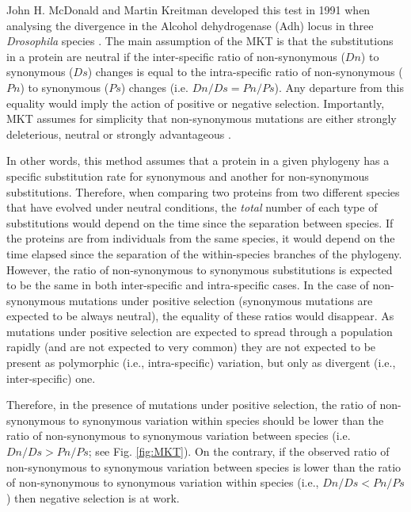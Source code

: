John H. McDonald and Martin Kreitman developed this test in 1991 when analysing the divergence in the Alcohol dehydrogenase (Adh) locus in three \textit{Drosophila} species	\citep{McDonald1991}. 
%
The main assumption of the MKT is that the substitutions in a protein are neutral if the inter-specific ratio of non-synonymous ($Dn$) to synonymous ($Ds$) changes is equal to the intra-specific ratio of non-synonymous ($Pn$) to synonymous ($Ps$) changes (i.e. $Dn/Ds = Pn/Ps$).
Any departure from this equality would imply the action of positive or negative selection.
%
Importantly, MKT assumes for simplicity that non-synonymous mutations are either strongly deleterious, neutral or strongly advantageous \citep{McDonald1991}.
%

In other words, this method assumes that a protein in a given phylogeny has a specific substitution rate for synonymous and another for non-synonymous substitutions. Therefore, when comparing two proteins from two different species that have evolved under neutral conditions, the \textit{total} number of each type of substitutions would depend on the time since the separation between species. If the proteins are from individuals from the same species, it would depend on the time elapsed since the separation of the within-species branches of the phylogeny.
However, the ratio of non-synonymous to synonymous substitutions is expected to be the same in both inter-specific and intra-specific cases. 
In the case of non-synonymous mutations under positive selection (synonymous mutations are expected to be always neutral), the equality of these ratios would disappear. As mutations under positive selection are expected to spread through a population rapidly (and are not expected to very common) they are not expected to be present as polymorphic (i.e., intra-specific) variation, but only as divergent (i.e., inter-specific) one.

Therefore, in the presence of mutations under positive selection, the ratio of non-synonymous to synonymous variation within species should be lower than the ratio of non-synonymous to synonymous variation between species (i.e. $Dn/Ds > Pn/Ps$; see Fig. \ref{fig:MKT}). 
On the contrary, if the observed ratio of non-synonymous to synonymous variation between species is lower than the ratio of non-synonymous to synonymous variation within species (i.e., $Dn/Ds < Pn/Ps$) then negative selection is at work.
%

